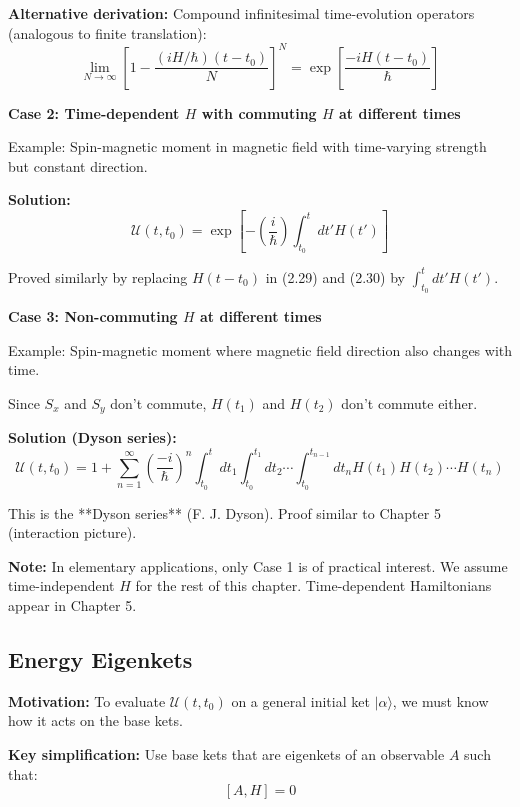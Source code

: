 \documentclass[11pt,a4paper]{article}
\begin{document}
\textbf{Alternative derivation:} Compound infinitesimal time-evolution operators (analogous to finite translation):
\begin{equation}
\lim_{N \to \infty}\left[1 - \frac{(iH/\hbar)(t - t_0)}{N}\right]^N = \exp\left[\frac{-iH(t - t_0)}{\hbar}\right]
\tag{2.31}
\end{equation}

\textbf{Case 2: Time-dependent $H$ with commuting $H$ at different times}

Example: Spin-magnetic moment in magnetic field with time-varying strength but constant direction.

\textbf{Solution:}
\begin{equation}
\mathscr{U}(t, t_0) = \exp\left[-\left(\frac{i}{\hbar}\right)\int_{t_0}^t dt'H(t')\right]
\tag{2.32}
\end{equation}

Proved similarly by replacing $H(t - t_0)$ in (2.29) and (2.30) by $\int_{t_0}^t dt'H(t')$.

\textbf{Case 3: Non-commuting $H$ at different times}

Example: Spin-magnetic moment where magnetic field direction also changes with time.

Since $S_x$ and $S_y$ don't commute, $H(t_1)$ and $H(t_2)$ don't commute either.

\textbf{Solution (Dyson series):}
\begin{equation}
\mathscr{U}(t, t_0) = 1 + \sum_{n=1}^{\infty}\left(\frac{-i}{\hbar}\right)^n \int_{t_0}^t dt_1 \int_{t_0}^{t_1} dt_2 \cdots \int_{t_0}^{t_{n-1}} dt_n H(t_1)H(t_2)\cdots H(t_n)
\tag{2.33}
\end{equation}

This is the **Dyson series** (F. J. Dyson). Proof similar to Chapter 5 (interaction picture).

\textbf{Note:} In elementary applications, only Case 1 is of practical interest. We assume time-independent $H$ for the rest of this chapter. Time-dependent Hamiltonians appear in Chapter 5.

\subsection{Energy Eigenkets}

\textbf{Motivation:} To evaluate $\mathscr{U}(t, t_0)$ on a general initial ket $|\alpha\rangle$, we must know how it acts on the base kets.

\textbf{Key simplification:} Use base kets that are eigenkets of an observable $A$ such that:
\begin{equation}
\boxed{[A, H] = 0}
\tag{2.34}
\end{equation}
\end{document}
